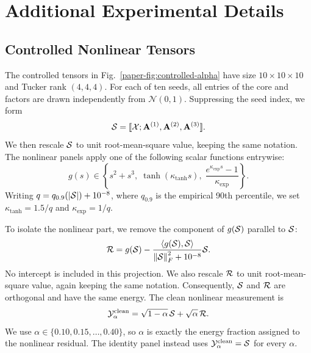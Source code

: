 \section{Additional Experimental Details}
\label{supp:experiments}

\subsection{Controlled Nonlinear Tensors}
\label{supp:controlled-details}

The controlled tensors in Fig.~\ref{paper-fig:controlled-alpha} have size
$10\times10\times10$ and Tucker rank $(4,4,4)$. For each of ten seeds, all
entries of the core and factors are drawn independently from $\mathcal{N}(0,1)$.
Suppressing the seed index, we form
\begin{equation}
  \mathcal{S}=[\![ \mathcal{X}; \mathbf{A}^{(1)},\mathbf{A}^{(2)},\mathbf{A}^{(3)} ]\!].
  \label{eq:supp-controlled-signal}
\end{equation}
We then rescale $\mathcal{S}$ to unit root-mean-square value, keeping the same notation.
The nonlinear panels apply one of the following scalar functions entrywise:
\begin{equation}
  g(s) \in
  \left\{
  s^2+s^3,\;
  \tanh(\kappa_{\tanh}s),\;
  \frac{e^{\kappa_{\exp}s}-1}{\kappa_{\exp}}
  \right\}.
  \label{eq:supp-controlled-responses}
\end{equation}
Writing $q=q_{0.9}(|\mathcal{S}|)+10^{-8}$, where $q_{0.9}$ is the empirical
90th percentile, we set $\kappa_{\tanh}=1.5/q$ and $\kappa_{\exp}=1/q$.

To isolate the nonlinear part, we remove the component of $g(\mathcal{S})$
parallel to $\mathcal{S}$:
\begin{equation}
  \mathcal{R}=g(\mathcal{S})
  -\frac{\left\langle g(\mathcal{S}),\mathcal{S} \right\rangle}
  {\left\lVert \mathcal{S} \right\rVert_F^2+10^{-8}}\mathcal{S}.
  \label{eq:supp-controlled-residual}
\end{equation}
No intercept is included in this projection. We also rescale $\mathcal{R}$ to unit
root-mean-square value, again keeping the same notation. Consequently,
$\mathcal{S}$ and $\mathcal{R}$ are orthogonal and have the same energy. The clean
nonlinear measurement is
\begin{equation}
  \mathcal{Y}_{\alpha}^{\mathrm{clean}}
  =\sqrt{1-\alpha}\,\mathcal{S}
  +\sqrt{\alpha}\,\mathcal{R}.
  \label{eq:supp-controlled-mixture}
\end{equation}
We use $\alpha\in\{0.10,0.15,\ldots,0.40\}$, so $\alpha$ is exactly the energy
fraction assigned to the nonlinear residual. The identity panel instead uses
$\mathcal{Y}_{\alpha}^{\mathrm{clean}}=\mathcal{S}$ for every $\alpha$.

